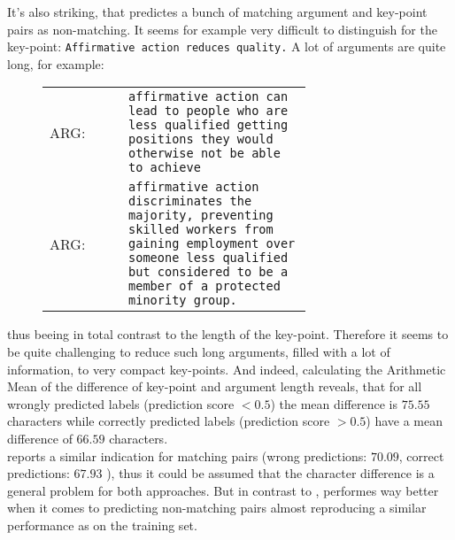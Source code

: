 It's also striking, that \Bert predictes a bunch of matching argument and key-point pairs as non-matching. It seems for 
example very difficult to distinguish for the key-point: \texttt{Affirmative action reduces quality.} A lot of 
arguments are quite long, for example:\\

\begin{figure}[H]
    \begin{tabularx}{\linewidth}{lp{0.7\linewidth}}
            ARG: & \texttt{affirmative action can lead to people who are less qualified getting positions they would otherwise not be able to achieve}\\
            ARG: & \texttt{affirmative action discriminates the majority, preventing skilled workers from gaining employment over someone less qualified but considered to be a member of a protected minority group.}
    \end{tabularx}
\end{figure}

thus beeing in total contrast to the length of the key-point. Therefore it seems to be quite challenging to reduce 
such long arguments, filled with a lot of information, to very compact key-points. And indeed, 
calculating the Arithmetic Mean of the difference of key-point and argument length reveals, that 
for all wrongly predicted labels (prediction score $< 0.5$) the mean difference is $75.55$ characters while 
correctly predicted labels (prediction score $> 0.5$) have a mean difference of $66.59$ characters.\\

\Roberta reports a similar indication for matching pairs (wrong predictions: $70.09$, correct predictions: $67.93$ ), 
thus it could be assumed that the character difference is a general problem for both approaches. 
But in contrast to \Bert, \Roberta performes way better when it comes to predicting non-matching pairs
almost reproducing a similar performance as on the training set.

